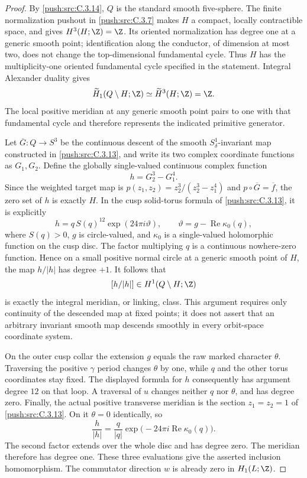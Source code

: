 \begin{proof}
By \ref{push:src:C.3.14}, $Q$ is the standard smooth five-sphere. The finite
normalization pushout in \ref{push:src:C.3.7} makes $H$ a compact, locally
contractible space, and gives $H^3(H;\Z)=\Z$. Its oriented
normalization has degree one at a generic smooth point; identification
along the conductor, of dimension at most two, does not change the
top-dimensional fundamental cycle. Thus $H$ has the multiplicity-one
oriented fundamental cycle specified in the statement. Integral
Alexander duality gives
\[
 \widetilde H_1(Q\setminus H;\Z)
 \simeq \widetilde H^3(H;\Z)=\Z.
\]
The local positive meridian at any generic smooth point pairs to one
with that fundamental cycle and therefore represents the indicated
primitive generator.

Let $\overline G:Q\to S^3$ be the continuous descent of the smooth
$S^1_\delta$-invariant map constructed in \ref{push:src:C.3.13}, and write its two
complex coordinate functions as $G_1,G_2$. Define the globally
single-valued continuous complex function
\[
 h=G_2^3-G_1^4.
\]
Since the weighted target map is
$p(z_1,z_2)=z_2^3/(z_2^3-z_1^4)$ and
$p\circ\overline G=\overline f$, the zero set of $h$ is exactly $H$.
In the cusp solid-torus formula of \ref{push:src:C.3.13}, it is explicitly
\[
 h=q\,S(q)^{12}\exp(24\pi i\vartheta),\qquad
 \vartheta=g-\operatorname{Re}\kappa_0(q),
\]
where $S(q)>0$, $g$ is circle-valued, and $\kappa_0$ is a
single-valued holomorphic function on the cusp disc. The factor
multiplying $q$ is a continuous nowhere-zero function. Hence on a
small positive normal circle at a generic smooth point of $H$, the
map $h/|h|$ has degree $+1$. It follows that
\[
 [h/|h|]\in H^1(Q\setminus H;\Z)
\]
is exactly the integral meridian, or linking, class. This argument
requires only continuity of the descended map at fixed points; it
does not assert that an arbitrary invariant smooth map descends
smoothly in every orbit-space coordinate system.

On the outer cusp collar the extension $g$ equals the raw marked
character $\theta$. Traversing the positive $\gamma$ period changes
$\theta$ by one, while $q$ and the other torus coordinates stay fixed.
The displayed formula for $h$ consequently has argument degree
$12$ on that loop. A traversal of $u$ changes neither $q$ nor
$\theta$, and has degree zero. Finally, the actual positive
transverse meridian is the section $z_1=z_2=1$ of \ref{push:src:C.3.13}. On it
$\theta=0$ identically, so
\[
 \frac{h}{|h|}
 =\frac{q}{|q|}\exp\bigl(-24\pi i\operatorname{Re}\kappa_0(q)\bigr).
\]
The second factor extends over the whole disc and has degree zero.
The meridian therefore has degree one. These three evaluations give
the asserted inclusion homomorphism. The commutator direction $w$
is already zero in $H_1(L;\Z)$.
\end{proof}

